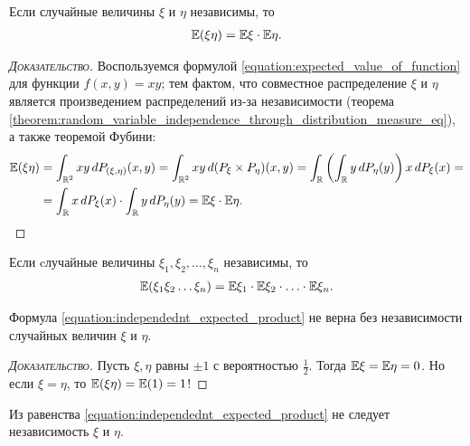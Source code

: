 \documentclass[../main.tex]{subfiles}
\begin{document}
\begin{prop}
 \label{proposition:independent_expected_product}
 Если случайные величины $ \xi $ и $ \eta $ независимы, то
 \begin{align}
  \label{equation:independednt_expected_product}
  \mathbb E(\xi \eta) = \mathbb E\xi \cdot \mathbb E\eta.
 \end{align} 
\end{prop}
\begin{proof}[\normalfont\textsc{Доказательство}]
 Воспользуемся формулой \eqref{equation:expected_value_of_function} для функции $ f(x,y) = xy $; тем фактом, что совместное распределение $ \xi $ и $ \eta $ является произведением распределений из-за независимости (теорема \ref{theorem:random_variable_independence_through_distribution_measure_eq}), а также теоремой Фубини:
 \begin{align*}
  \mathbb E(\xi\eta) &= \int_{\mathbb{R}^{2}} xy \,dP_{(\xi,\eta)} (x,y) = \int_{\mathbb{R}^{2}} xy\,d(P_{\xi} \times P_{\eta})(x,y) = \int_{\mathbb{R}} \left( \int_{\mathbb{R}} y\,dP_\eta(y)  \right)x\, dP_\xi(x) = \\
  &=  \int_{\mathbb{R}} x\,dP_\xi(x)  \cdot  \int_{\mathbb{R}} y\,dP_\eta(y)   = \mathbb E \xi \cdot \mathbb E\eta.
 \end{align*} 
\end{proof}
\begin{crly}
 Если cлучайные величины $ \xi_1,\xi_2, \ldots, \xi_n $ независимы, то
 \begin{align*}
  \mathbb E(\xi_1 \xi_2 \ldots \xi_n) = \mathbb E\xi_1 \cdot \mathbb E\xi_2 \cdot \ldots \cdot \mathbb E\xi_n.
 \end{align*} 
\end{crly}
\begin{remrk}
  Формула \eqref{equation:independednt_expected_product} не верна без независимости случайных величин $ \xi $ и $ \eta $.
\end{remrk}
\begin{proof}[\normalfont\textsc{Доказательство}]
 Пусть $ \xi, \eta $ равны $ \pm 1 $ с вероятностью $ \frac{1}{2} $. Тогда $ \mathbb E\xi = \mathbb E\eta = 0 $. Но если $ \xi = \eta $, то $ \mathbb E(\xi\eta) = \mathbb E(1) = 1 $!
\end{proof}
\begin{remrk}
 Из равенства \eqref{equation:independednt_expected_product} не следует независимость $ \xi $ и $ \eta $.
\end{remrk}
\end{document}
